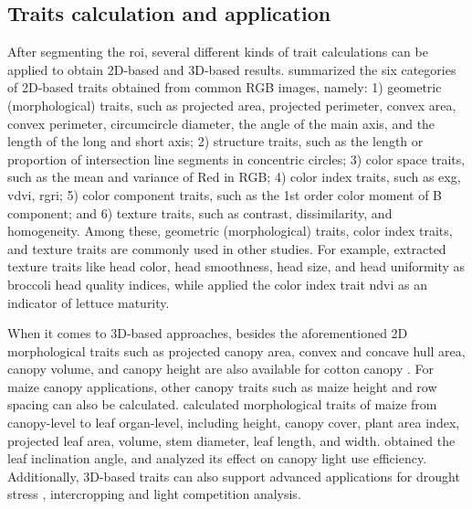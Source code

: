 \subsection{Traits calculation and application}

After segmenting the \gls{roi}, several different kinds of trait calculations can be applied to obtain 2D-based and 3D-based results. \citet[Table 1]{du_greenhouse_2021} summarized the six categories of 2D-based traits obtained from common RGB images, namely: 1) geometric (morphological) traits, such as projected area, projected perimeter, convex area, convex perimeter, circumcircle diameter, the angle of the main axis, and the length of the long and short axis; 2) structure traits, such as the length or proportion of intersection line segments in concentric circles; 3) color space traits, such as the mean and variance of Red in RGB; 4) color index traits, such as \gls{exg}, \gls{vdvi}, \gls{rgri}; 5) color component traits, such as the 1st order color moment of B component; and 6) texture traits, such as contrast, dissimilarity, and homogeneity. Among these, geometric (morphological) traits, color index traits, and texture traits are commonly used in other studies. For example, \citet{stansell_use_2017} extracted texture traits like head color, head smoothness, head size, and head uniformity as broccoli head quality indices, while \citet{bauer_combining_2019} applied the color index trait \gls{ndvi} as an indicator of lettuce maturity.

When it comes to 3D-based approaches, besides the aforementioned 2D morphological traits such as projected canopy area, convex and concave hull area, canopy volume, and canopy height are also available for cotton canopy \citep{jiang_quantitative_2018}. For maize canopy applications, other canopy traits such as maize height \citep{hammerle_mobile_2018,qiu_field-based_2019} and row spacing \citep{qiu_field-based_2019} can also be calculated. \citet[Table 3]{jin_non-destructive_2020} calculated morphological traits of maize from canopy-level to leaf organ-level, including height, canopy cover, plant area index, projected leaf area, volume, stem diameter, leaf length, and width. \citet{itakura_automatic_2018} obtained the leaf inclination angle, and \citet{liu_canopy_2021} analyzed its effect on canopy light use efficiency. Additionally, 3D-based traits can also support advanced applications for drought stress \citep{su_evaluating_2019, sorrentino_lettuce_2020}, intercropping \citep{liu_field-based_2021} and light competition \citep{zhu_quantification_2020} analysis.

